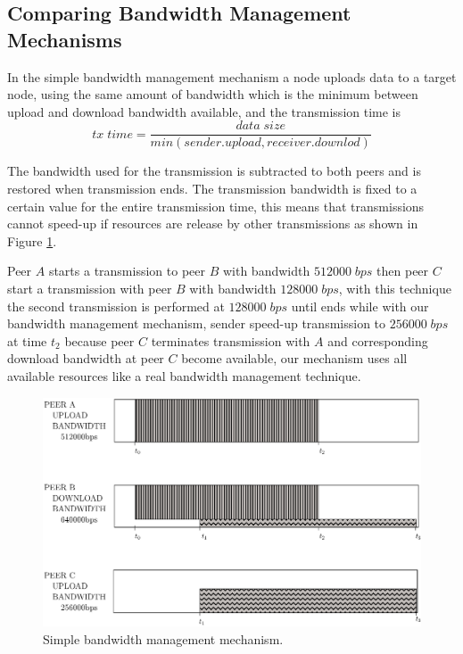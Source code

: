 \subsection{Comparing Bandwidth Management Mechanisms}
In the simple bandwidth management mechanism a node uploads data to a target node, using the same amount of bandwidth which is the minimum between upload and download bandwidth available, and the transmission time is
\begin{displaymath}
tx\;time = \frac{data\;size}{min(sender.upload, receiver.downlod)}
\end{displaymath}

The bandwidth used for the transmission is subtracted to both peers and is restored when transmission ends. The transmission bandwidth is fixed to a certain value for the entire transmission time, this means that transmissions cannot speed-up if resources are release by other transmissions as shown in Figure \ref{normalized-problem-one}.

Peer $A$ starts a transmission to peer $B$ with bandwidth $512000\;bps$ then peer $C$ start a transmission with peer $B$ with bandwidth $128000\;bps$, with this technique the second transmission is performed at $128000\;bps$ until ends while with our bandwidth management mechanism, sender speed-up transmission to $256000\;bps$ at time $t_{2}$ because peer $C$ terminates transmission with $A$ and corresponding download bandwidth at peer $C$ become available, our mechanism uses all available resources like a real bandwidth management technique.
\begin{figure}[ht]
\centering
\includegraphics[width=\textwidth]{img/simple-bandwidth-management-problem.eps}
\caption{Simple bandwidth management mechanism.}
\label{normalized-problem-one}
\end{figure}


